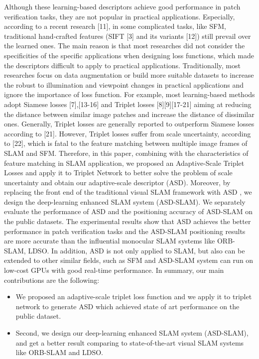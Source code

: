\documentclass[letterpaper, 10 pt, conference]{ieeeconf}  %
\begin{document}
Although these learning-based descriptors achieve good performance in patch verification tasks, they are not popular in practical applications. Especially, according to a recent research [11], in some complicated tasks, like SFM, traditional hand-crafted features (SIFT [3] and its variants [12]) still prevail over the learned ones. The main reason is that most researches did not consider the specificities of the specific applications when designing loss functions, which made the descriptors difficult to apply to practical applications. Traditionally, most researches focus on data augmentation or build more suitable datasets to increase the robust to illumination and viewpoint changes in practical applications and ignore the importance of loss function. For example, most learning-based methods adopt Siamese losses [7],[13-16] and Triplet losses [8][9][17-21] aiming at reducing the distance between similar image patches and increase the distance of dissimilar ones. Generally, Triplet losses are generally reported to outperform Siamese losses according to [21]. However, Triplet losses suffer from scale uncertainty, according to [22], which is fatal to the feature matching between multiple image frames of SLAM and SFM. Therefore, in this paper, combining with the characteristics of feature matching in SLAM application, we proposed an Adaptive-Scale Triplet Losses and apply it to Triplet Network to better solve the problem of scale uncertainty and obtain our adaptive-scale descriptor (ASD). Moreover, by replacing the front end of the traditional visual SLAM framework with ASD , we design the deep-learning enhanced SLAM system (ASD-SLAM). We separately evaluate the performance of ASD and the positioning accuracy of ASD-SLAM on the public datasets. The experimental results show that ASD achieves the better performance in patch verification tasks and the ASD-SLAM positioning results are more accurate than the influential monocular SLAM systems like ORB-SLAM, LDSO. In addition, ASD is not only applied to SLAM, but also can be extended to other similar fields, such as SFM and ASD-SLAM system can run on low-cost GPUs with good real-time performance. In summary, our main contributions are the following:
\begin{itemize}
\item We proposed an adaptive-scale triplet loss function and we apply it to triplet network to generate  ASD which achieved state of art  performance on the public dataset.
\item Second, we design our deep-learning enhanced SLAM system (ASD-SLAM), and get a better result comparing to state-of-the-art visual SLAM systems like ORB-SLAM and LDSO.
\end{itemize}
\end{document}
